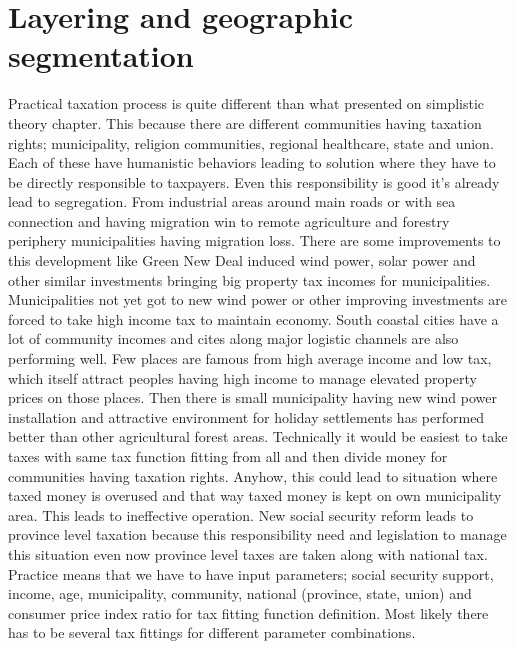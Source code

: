 \section{Layering and geographic segmentation}
\label{tax_layering}
Practical taxation process is quite different than what presented on simplistic theory chapter.
This because there are different communities having taxation rights;
municipality, religion communities, regional healthcare, state and union.
Each of these have humanistic behaviors leading to solution where they have to be directly responsible to taxpayers.
Even this responsibility is good it's already lead to segregation.
From industrial areas around main roads or with sea connection
and having migration win to remote agriculture
and forestry periphery municipalities having migration loss.
There are some improvements to this development like Green New Deal induced wind power,
solar power and other similar investments bringing big property tax incomes for municipalities.
Municipalities not yet got to new wind power or other improving investments
are forced to take high income tax to maintain economy.
South coastal cities have a lot of community incomes
and cites along major logistic channels are also performing well.
Few places are famous from high average income and low tax,
which itself attract peoples having high income to manage elevated property prices on those places.
Then there is small municipality having new wind power installation and attractive environment
for holiday settlements has performed better than other agricultural forest areas.
Technically it would be easiest to take taxes with same tax function fitting from all
and then divide money for communities having taxation rights.
Anyhow, this could lead to situation where taxed money is overused
and that way taxed money is kept on own municipality area.
This leads to ineffective operation.
New social security reform leads to province level taxation because this responsibility need
and legislation to manage this situation even now province level taxes are taken along with national tax.
Practice means that we have to have input parameters;
social security support, income, age, municipality, community, national (pro\-vin\-ce, state, union)
and consumer price index ratio for tax fitting function definition.
Most likely there has to be several tax fittings for different parameter combinations.

